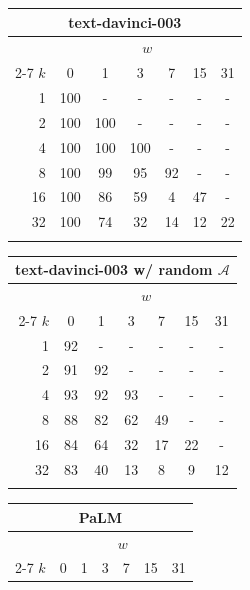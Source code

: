 \documentclass{article}
\begin{document}
\begin{table}[h]
\parbox{.32\linewidth}{
    \small
    \setlength\tabcolsep{3.5pt}
    \centering
    \begin{tabular}{@{}rcccccc@{}}
    \multicolumn{7}{c}{text-davinci-003} \\
    \toprule
    & \multicolumn{6}{c}{$w$} \\
    \cmidrule(lr){2-7}
    $k$&0&1&3&7&15&31 \\
    \midrule
    1&100&-&-&-&-&- \\
    2&100&100&-&-&-&- \\
    4&100&100&100&-&-&- \\
    8&100&99&95&92&-&- \\
    16&100&86&59&4&47&- \\
    32&100&74&32&14&12&22 \\
    \bottomrule
    \vspace{-0.5em}
    \end{tabular}
    \vspace{-1.0em}
    \label{tab:pcfg-results-kw-davinci}
}
\parbox{.32\linewidth}{
    \small
    \setlength\tabcolsep{3.5pt}
    \centering
    \begin{tabular}{@{}rcccccc@{}}
    \multicolumn{7}{c}{text-davinci-003 w/ random $\mathcal{A}$} \\
    \toprule
    & \multicolumn{6}{c}{$w$} \\
    \cmidrule(lr){2-7}
    $k$&0&1&3&7&15&31 \\
    \midrule
    1&92&-&-&-&-&- \\
    2&91&92&-&-&-&- \\
    4&93&92&93&-&-&- \\
    8&88&82&62&49&-&- \\
    16&84&64&32&17&22&- \\
    32&83&40&13&8&9&12 \\
    \bottomrule
    \vspace{-0.5em}
    \end{tabular}
    \vspace{-1.0em}
    \label{tab:pcfg-results-kw-davinci-rand}
}
\parbox{.32\linewidth}{
    \small
    \setlength\tabcolsep{3.5pt}
    \centering
    \begin{tabular}{@{}rcccccc@{}}
    \multicolumn{7}{c}{PaLM} \\
    \toprule
    & \multicolumn{6}{c}{$w$} \\
    \cmidrule(lr){2-7}
    $k$&0&1&3&7&15&31 \\

\end{tabular}}
\end{table}
\end{document}

